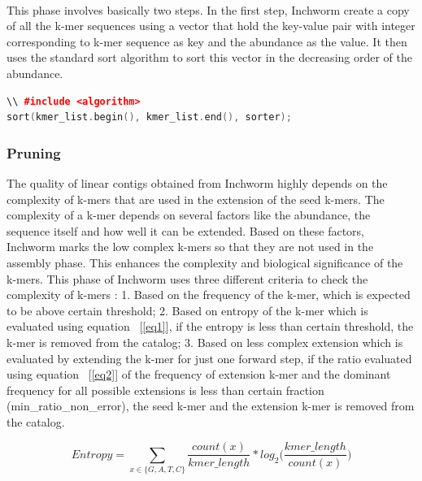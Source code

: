 \label{key}\documentclass[plainarticle, english ,zihtitle,final,hyperref,utf8]{zihpub}
\begin{document}
\paragraph{}
This phase involves basically two steps. In the first step, Inchworm create a copy of all the k-mer sequences using a vector that hold the key-value pair with integer corresponding to k-mer sequence as key and the abundance as the value. It then uses the standard sort algorithm to sort this vector in the decreasing order of the abundance. 
\begin{lstlisting}[language=C++]
\\ #include <algorithm>
sort(kmer_list.begin(), kmer_list.end(), sorter);
\end{lstlisting}
\subsubsection{Pruning}
The quality of linear contigs obtained from Inchworm highly depends on the complexity of k-mers that are used in the extension of the seed k-mers. The complexity of a k-mer depends on several factors like the abundance, the sequence itself and how well it can be extended. Based on these factors, Inchworm marks the low complex k-mers so that they are not used in the assembly phase. This enhances the complexity and biological significance of the k-mers. This phase of Inchworm uses three different criteria to check the complexity of k-mers : 1. Based on the frequency of the k-mer, which is expected to be above certain threshold; 2. Based on entropy of the k-mer which is evaluated using equation ~[\ref{eq1}], if the entropy is less than certain threshold, the k-mer is removed from the catalog; 3. Based on less complex extension which is evaluated by extending the k-mer for just one forward step, if the ratio evaluated using equation ~[\ref{eq2}] of the frequency of extension k-mer and the dominant frequency for all possible extensions is less than certain fraction (min\_ratio\_non\_error), the seed k-mer and the extension k-mer is removed from the catalog.

\begin{equation}
Entropy = \sum_{x \in \{G,A,T,C\}} \frac{count(x)}{kmer\_length}  * log_2 \bigg(\frac{kmer\_length}{count(x)} \bigg ) 
\label{eq1}
\end{equation}
\end{document}
